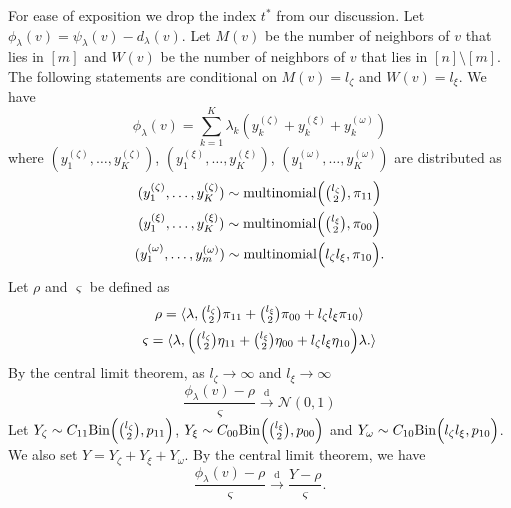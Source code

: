 \documentclass[10pt,journal,compsoc]{IEEEtran}
\theoremstyle{definition}
\begin{document}
\begin{IEEEproof}
  For ease of exposition we drop the index $t^{*}$ from our discussion. Let
  $\phi_{\lambda}(v) = \psi_{\lambda}(v) - d_{\lambda}(v)$. Let
  $M(v)$ be the number of neighbors of $v$ that lies in $[m]$ and
  $W(v)$ be the number of neighbors of $v$ that lies in $[n]
\setminus [m]$. The following statements are conditional on
$M(v) = l_{\zeta}$ and $W(v) = l_{\xi}$. We have
\begin{equation}
  \phi_{\lambda}(v) = \sum_{k=1}^{K} \lambda_k ( y^{(\zeta)}_k +
  y^{(\xi)}_k + y^{(\omega)}_k)
\end{equation}
where $(y^{(\zeta)}_1, \dots, y^{(\zeta)}_K)$, $(y^{(\xi)}_1,\dots,
 y^{(\xi)}_K)$,  $(y^{(\omega)}_1, \dots, y^{(\omega)}_K)$ are
 distributed as
\begin{gather*}
(y^{(\zeta)}_1,\dots,y^{(\zeta)}_K) \sim \textrm{multinomial}\Bigl(
\tbinom{l_\zeta}{2}, \pi_{11}\Bigr) \\ 
(y^{(\xi)}_1,\dots,y^{(\xi)}_K) \sim \textrm{multinomial}\Bigl(
\tbinom{l_\xi}{2}, \pi_{00}\Bigr) \\
(y^{(\omega)}_1,\dots,y^{(\omega)}_m) \sim \textrm{multinomial}\Bigl(
l_\zeta l_\xi, \pi_{10}\Bigr).
\end{gather*}
Let $\rho$ and $\varsigma$ be defined as
\begin{gather*}
  \rho = \langle \lambda, \tbinom{l_{\zeta}}{2} \pi_{11} +
  \tbinom{l_{\xi}}{2} \pi_{00} + l_{\zeta} l_{\xi} \pi_{10} \rangle \\
  \varsigma = \langle \lambda, \Bigl(\tbinom{l_{\zeta}}{2} \eta_{11} +
  \tbinom{l_{\xi}}{2} \eta_{00} + l_{\zeta} l_{\xi} \eta_{10}\Bigr)
  \lambda.
  \rangle
\end{gather*}
By the central limit theorem, as $l_{\zeta} \rightarrow
\infty$ and $l_{\xi} \rightarrow \infty$
\begin{equation}
  \label{eq:16}
  \frac{\phi_{\lambda}(v) - \rho}{\varsigma}  \overset{\mathrm{d}}{\longrightarrow}  \mathcal{N}(0,1)
\end{equation}
Let $Y_{\zeta} \sim C_{11} \mathrm{Bin}\Bigl(\tbinom{l_{\zeta}}{2},
p_{11}\Bigr)$, $Y_{\xi} \sim C_{00} \mathrm{Bin}\Bigl(\tbinom{l_\xi}{2},
p_{00}\Bigr)$ and $Y_{\omega} \sim C_{10} \mathrm{Bin}\Bigl( l_{\zeta}
l_{\xi}, p_{10} \Bigr)$. We also set $Y = Y_{\zeta} + Y_{\xi} +
Y_{\omega}$. By the central limit theorem, we have
\begin{equation}
  \label{eq:21}
 \frac{\phi_{\lambda}(v) - \rho}{\varsigma}
 \overset{\mathrm{d}}{\longrightarrow}  \frac{Y - \rho}{\varsigma}.

\end{equation}
\end{IEEEproof}
\end{document}
